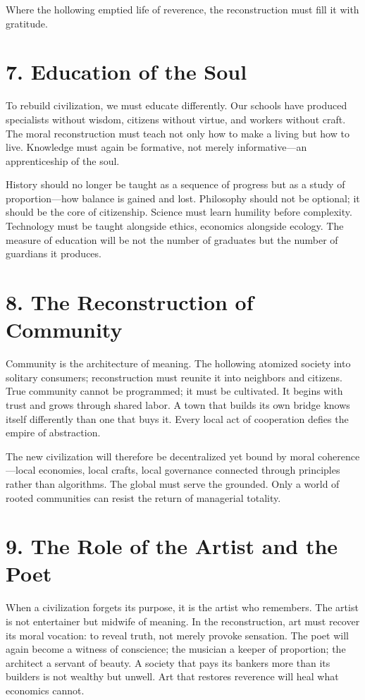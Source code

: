 \documentclass[11pt,twoside]{book}
\begin{document}
Where the hollowing emptied life of reverence, the reconstruction must fill it with gratitude.

\section*{7. Education of the Soul}

To rebuild civilization, we must educate differently.  
Our schools have produced specialists without wisdom, citizens without virtue, and workers without craft.  
The moral reconstruction must teach not only how to make a living but how to live.  
Knowledge must again be formative, not merely informative—an apprenticeship of the soul.

History should no longer be taught as a sequence of progress but as a study of proportion—how balance is gained and lost.  
Philosophy should not be optional; it should be the core of citizenship.  
Science must learn humility before complexity.  
Technology must be taught alongside ethics, economics alongside ecology.  
The measure of education will be not the number of graduates but the number of guardians it produces.

\section*{8. The Reconstruction of Community}

Community is the architecture of meaning.  
The hollowing atomized society into solitary consumers; reconstruction must reunite it into neighbors and citizens.  
True community cannot be programmed; it must be cultivated.  
It begins with trust and grows through shared labor.  
A town that builds its own bridge knows itself differently than one that buys it.  
Every local act of cooperation defies the empire of abstraction.

The new civilization will therefore be decentralized yet bound by moral coherence—local economies, local crafts, local governance connected through principles rather than algorithms.  
The global must serve the grounded.  
Only a world of rooted communities can resist the return of managerial totality.

\section*{9. The Role of the Artist and the Poet}

When a civilization forgets its purpose, it is the artist who remembers.  
The artist is not entertainer but midwife of meaning.  
In the reconstruction, art must recover its moral vocation: to reveal truth, not merely provoke sensation.  
The poet will again become a witness of conscience; the musician a keeper of proportion; the architect a servant of beauty.  
A society that pays its bankers more than its builders is not wealthy but unwell.  
Art that restores reverence will heal what economics cannot.
\end{document}

